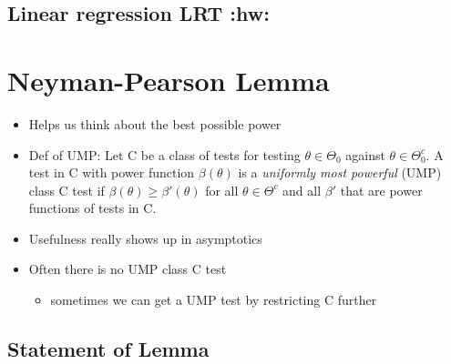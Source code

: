 \subsection{Linear regression LRT \textbf{:hw:}}

\section{Neyman-Pearson Lemma}

\begin{itemize}
\item Helps us think about the best possible power
\item Def of UMP: Let C be a class of tests for testing $θ ∈ Θ_0$
  against $θ ∈ Θ_0^c$.  A test in C with power function $β(θ)$ is a
  \emph{uniformly most powerful} (UMP) class C test if $β(θ) ≥ β'(θ)$
  for all $θ ∈ Θ^c$ and all $β'$ that are power functions of tests in
  C.
\item Usefulness really shows up in asymptotics
\item Often there is no UMP class C test
\begin{itemize}
\item sometimes we can get a UMP test by restricting C further
\end{itemize}
\end{itemize}

\subsection{Statement of Lemma}

